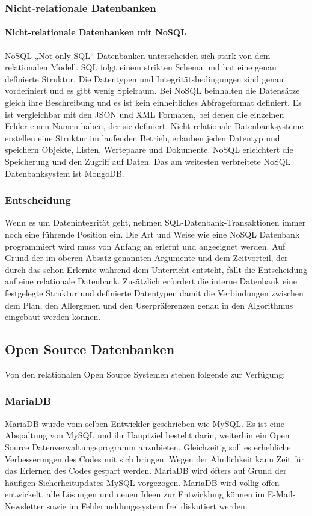 \subsubsection{Nicht-relationale Datenbanken}
\paragraph{Nicht-relationale Datenbanken mit NoSQL }
NoSQL \cite{NoSQL} „Not only SQL“ Datenbanken unterscheiden sich stark von dem relationalen Modell. SQL folgt einem strikten Schema und hat eine genau definierte Struktur. Die Datentypen und Integritätsbedingungen sind genau vordefiniert und es gibt wenig Spielraum. Bei NoSQL beinhalten die Datensätze gleich ihre Beschreibung und es ist kein einheitliches Abfrageformat definiert. Es ist vergleichbar mit den JSON und XML Formaten, bei denen die einzelnen Felder einen Namen haben, der sie definiert. Nicht-relationale Datenbanksysteme erstellen eine Struktur im laufenden Betrieb, erlauben jeden Datentyp und speichern Objekte, Listen, Wertepaare und Dokumente. NoSQL erleichtert die Speicherung und den Zugriff auf Daten. Das am weitesten verbreitete  NoSQL Datenbanksystem ist MongoDB. 
\subsubsection{Entscheidung}
Wenn es um Datenintegrität geht, nehmen SQL-Datenbank-Transaktionen immer noch eine führende Position ein. Die Art und Weise wie eine NoSQL Datenbank programmiert wird muss von Anfang an erlernt und angeeignet werden. Auf Grund der im oberen Absatz genannten Argumente und dem Zeitvorteil, der durch das schon Erlernte während dem Unterricht entsteht, fällt die Entscheidung auf eine relationale Datenbank. Zusätzlich erfordert die interne Datenbank eine festgelegte Struktur und definierte Datentypen damit die Verbindungen zwischen dem Plan, den Allergenen und den Userpräferenzen genau in den Algorithmus eingebaut werden können.

\subsection{Open Source Datenbanken}
Von den relationalen Open Source Systemen stehen folgende zur Verfügung: 

\subsubsection{MariaDB \cite{MariaDBDefinition}} 
MariaDB wurde vom selben Entwickler geschrieben wie MySQL. Es ist eine Abspaltung von MySQL und ihr Hauptziel besteht darin, weiterhin ein Open Source Datenverwaltungsprogramm anzubieten. Gleichzeitig soll es erhebliche Verbesserungen des Codes mit sich bringen. Wegen der Ähnlichkeit kann Zeit für das Erlernen des Codes gespart werden. MariaDB wird öfters auf Grund der häufigen Sicherheitupdates MySQL vorgezogen. MariaDB wird völlig offen entwickelt, alle Lösungen und neuen Ideen zur Entwicklung können im E-Mail-Newsletter sowie im Fehlermeldungssystem frei diskutiert werden. 

